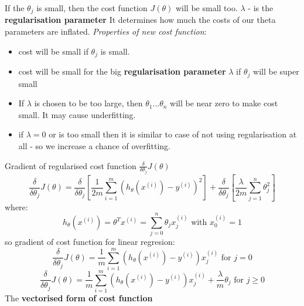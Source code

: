 \documentclass{article}
\begin{document}
If the $\theta_j$ is small, then the cost function $J(\theta)$ will be small too. 
\newline
$\lambda$ - is the \textbf{regularisation parameter} It determines how much the costs of our theta parameters are inflated.
\newline
\newline
\textit{Properties of new cost function}: 
\begin{itemize}
\item cost will be small if $\theta_j$ is small.
\item cost will be small for the big \textbf{regularisation parameter} $\lambda$ if $\theta_j$ will be super small
\item If $\lambda$ is chosen to be too large, then $\theta_1...\theta_n$ will be near zero to make cost small. It may cause underfitting. 
\item if $\lambda=0$ or is too small then it is similar to case of not using regularisation at all - so we increase a chance of overfitting.
\end{itemize}
Gradient of regularised cost function $\frac{\delta}{\delta \theta_j}J(\theta)$
\begin{equation}
\frac{\delta}{\delta \theta_j}J(\theta) =\frac{\delta}{\delta \theta_j}\left[ \dfrac{1}{2m} \sum_{i=1}^m (h_\theta(x^{(i)}) - y^{(i)})^2 \right] + \frac{\delta}{\delta \theta_j} \left[ \dfrac{\lambda}{2m} \sum_{j=1}^n \theta_j^2 \right]
\end{equation}
where:
\begin{equation*}
h_\theta(x^{(i)})=\theta^Tx^{(i)}=\sum_{j=0}^n\theta_jx^{(i)}_j \text{ with } x^{(i)}_0 = 1
\end{equation*}
so gradient of cost function for linear regresion:
\begin{equation}
\frac{\delta}{\delta \theta_j} J(\theta) = \dfrac{1}{m} \sum_{i=1}^m (h_\theta(x^{(i)}) - y^{(i)})x^{(i)}_j \text{ for } j=0
\end{equation}
\begin{equation}
\frac{\delta}{\delta \theta_j} J(\theta) = \dfrac{1}{m} \sum_{i=1}^m (h_\theta(x^{(i)}) - y^{(i)})x^{(i)}_j + \dfrac{\lambda}{m}\theta_j \text{ for } j\ge0
\end{equation}
The \textbf{vectorised form of cost function} 
\newline
\color{red}
\end{document}
